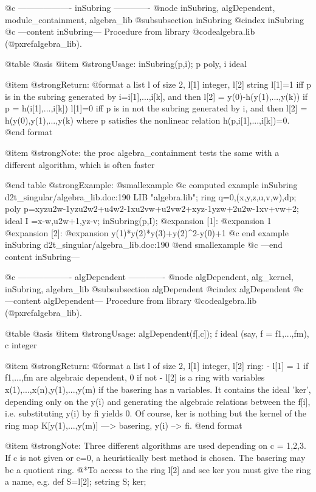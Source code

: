 @c ------------------- inSubring -------------
@node inSubring, algDependent, module_containment, algebra_lib
@subsubsection inSubring
@cindex inSubring
@c ---content inSubring---
Procedure from library @code{algebra.lib} (@pxref{algebra_lib}).

@table @asis
@item @strong{Usage:}
inSubring(p,i); p poly, i ideal

@item @strong{Return:}
@format
         a list l of size 2, l[1] integer, l[2] string
         l[1]=1 iff p is in the subring generated by i=i[1],...,i[k],
                and then l[2] = y(0)-h(y(1),...,y(k)) if p = h(i[1],...,i[k])
         l[1]=0 iff p is in not the subring generated by i,
                and then l[2] = h(y(0),y(1),...,y(k) where p satisfies the
                nonlinear relation h(p,i[1],...,i[k])=0.
@end format

@item @strong{Note:}
the proc algebra_containment tests the same with a different
algorithm, which is often faster

@end table
@strong{Example:}
@smallexample
@c computed example inSubring d2t_singular/algebra_lib.doc:190 
LIB "algebra.lib";
ring q=0,(x,y,z,u,v,w),dp;
poly p=xyzu2w-1yzu2w2+u4w2-1xu2vw+u2vw2+xyz-1yzw+2u2w-1xv+vw+2;
ideal I =x-w,u2w+1,yz-v;
inSubring(p,I);
@expansion{} [1]:
@expansion{}    1
@expansion{} [2]:
@expansion{}    y(1)*y(2)*y(3)+y(2)^2-y(0)+1
@c end example inSubring d2t_singular/algebra_lib.doc:190
@end smallexample
@c ---end content inSubring---

@c ------------------- algDependent -------------
@node algDependent, alg_kernel, inSubring, algebra_lib
@subsubsection algDependent
@cindex algDependent
@c ---content algDependent---
Procedure from library @code{algebra.lib} (@pxref{algebra_lib}).

@table @asis
@item @strong{Usage:}
algDependent(f[,c]); f ideal (say, f = f1,...,fm), c integer

@item @strong{Return:}
@format	
         a list l  of size 2, l[1] integer, l[2] ring:
         - l[1] = 1 if f1,...,fm are algebraic dependent, 0 if not
         - l[2] is a ring with variables x(1),...,x(n),y(1),...,y(m) if the
           basering has n variables. It contains the ideal 'ker', depending
           only on the y(i) and generating the algebraic relations between the
           f[i], i.e. substituting y(i) by fi yields 0. Of course, ker is
           nothing but the kernel of the ring map
              K[y(1),...,y(m)] ---> basering,  y(i) --> fi.
@end format

@item @strong{Note:}
Three different algorithms are used depending on c = 1,2,3.
If c is not given or c=0, a heuristically best method is chosen.
The basering may be a quotient ring.
@*To access to the ring l[2] and see ker you must give the ring a name,
e.g. def S=l[2]; setring S; ker;

